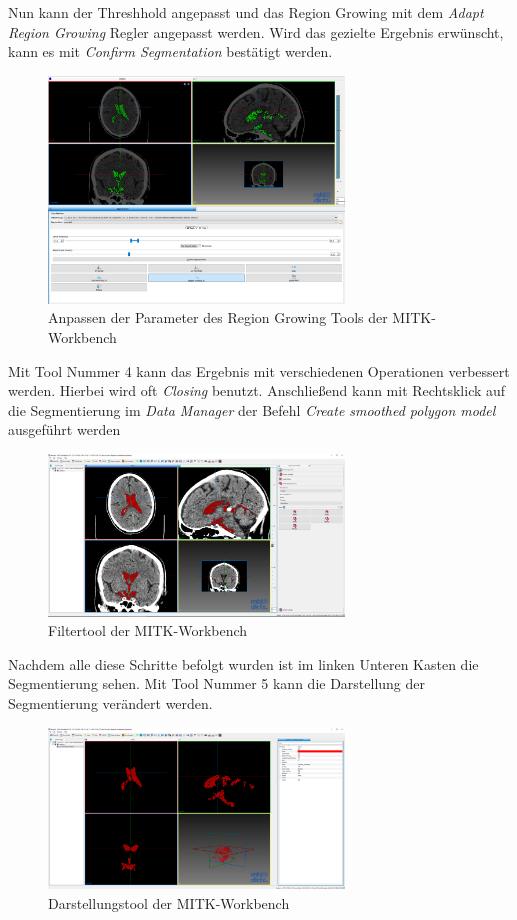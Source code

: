 Nun kann der Threshhold angepasst und das Region Growing mit dem \textit{Adapt Region Growing} Regler angepasst werden. Wird das gezielte Ergebnis erwünscht, kann es mit \textit{Confirm Segmentation} bestätigt werden.

\begin{figure}[H] 
\centering 
\includegraphics[width=0.7\textwidth]{Logos/MITK_Doku/8.PNG}
\caption{Anpassen der Parameter des Region Growing Tools  der MITK-Workbench} 
\label{fig:acht} 
\end{figure}

Mit Tool Nummer 4 kann das Ergebnis mit verschiedenen Operationen verbessert werden. Hierbei wird oft \textit{Closing} benutzt. Anschließend kann mit Rechtsklick auf die Segmentierung im \textit{Data Manager} der Befehl \textit{Create smoothed polygon model} ausgeführt werden

\begin{figure}[H] 
\centering 
\includegraphics[width=0.7\textwidth]{Logos/MITK_Doku/9.PNG}
\caption{Filtertool der MITK-Workbench} 
\label{fig:neun} 
\end{figure}

Nachdem alle diese Schritte befolgt wurden ist im linken Unteren Kasten die Segmentierung sehen. Mit Tool Nummer 5 kann die Darstellung der Segmentierung verändert werden.

\begin{figure}[H] 
\centering 
\includegraphics[width=0.7\textwidth]{Logos/MITK_Doku/10.PNG}
\caption{Darstellungstool der MITK-Workbench} 
\label{fig:zehn} 
\end{figure}
